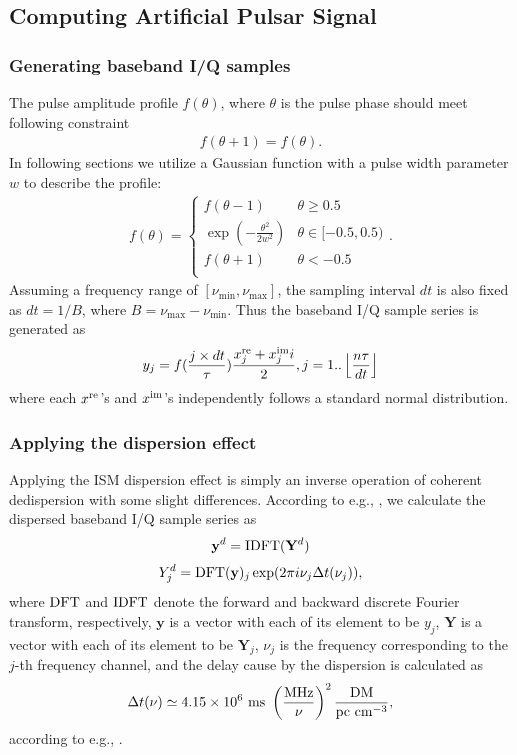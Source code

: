 \documentclass[fleqn,usenatbib]{mnras}
\begin{document}
\subsection{Computing Artificial Pulsar Signal}
\subsubsection{Generating baseband I/Q samples}
The pulse amplitude profile $f(\theta)$, where $\theta$ is the pulse phase should meet following constraint
\begin{gather}
    f(\theta+1)=f(\theta).
\end{gather}
In following sections we utilize a Gaussian function with a pulse width parameter $w$ to describe the profile:
\begin{gather}
    f(\theta)=\left \{
    \begin{array}{rl}
        f(\theta-1) &\theta \geq 0.5\\
         \exp(-\frac{\theta^2}{2w^2}) & \theta\in[-0.5, 0.5) \\
        f(\theta+1) &\theta < -0.5\\
    \end{array}
    \right ..
\end{gather}
Assuming a frequency range of $[\nu_{\min}, \nu_{\max}]$, the sampling interval $dt$ is also fixed as $dt=1/B$, where $B=\nu_{\max}-\nu_{\min}$.
Thus the baseband I/Q sample series is generated as 
\begin{gather}
    y_j=f(\frac{j\times dt}{\tau})\frac{x^{\rm re}_j+x^{\rm im}_ji}{2}, j=1..\left \lfloor\frac{n\tau}{dt} \right\rfloor
\end{gather}
where each $x^{\rm re}$'s and $x^{\rm im}$'s independently follows a standard normal distribution. 


 \subsubsection{Applying the dispersion effect}
  Applying the ISM dispersion effect is simply an inverse operation of coherent dedispersion with some slight differences.
  According to e.g., \citet{2012hpa..book.....L}, we calculate the dispersed baseband I/Q sample series as
  \begin{gather}
      \mathbf{y}^d={\rm IDFT}(\mathbf{Y}^d)
  \end{gather}
  \begin{gather}
      Y_j^d={\rm DFT}(\mathbf{y})_j\exp(2\pi i \nu_j\Delta t(\nu_j)),
  \end{gather}
  where ${\rm DFT}$ and ${\rm IDFT}$ denote the forward and backward discrete Fourier transform, respectively, $\mathbf{y}$ is a vector with each of its element to be $y_j$, $\mathbf{Y}$ is a vector with each of its element to be $\mathbf{Y}_j$, $\nu_j$ is the frequency corresponding to the $j$-th frequency channel, and the delay cause by the dispersion is calculated as 
  \begin{gather}
     \Delta t(\nu)\simeq 4.15\times 10^6~{\rm ms}~\left(\frac{{\rm MHz}}{\nu}\right)^2\frac{\rm DM}{\rm pc~cm^{-3}},
 \end{gather}
 according to e.g., \citet{2012hpa..book.....L}.
 
\end{document}
